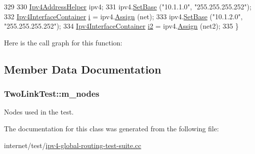 \begin{DoxyCode}
329 
330   \hyperlink{classns3_1_1Ipv4AddressHelper}{Ipv4AddressHelper} ipv4;
331   ipv4.\hyperlink{classns3_1_1Ipv4AddressHelper_acf7b16dd25bac67e00f5e25f90a9a035}{SetBase} (\textcolor{stringliteral}{"10.1.1.0"}, \textcolor{stringliteral}{"255.255.255.252"});
332   \hyperlink{classns3_1_1Ipv4InterfaceContainer}{Ipv4InterfaceContainer} \hyperlink{bernuolliDistribution_8m_a6f6ccfcf58b31cb6412107d9d5281426}{i} = ipv4.\hyperlink{classns3_1_1Ipv4AddressHelper_af8e7f4a1a7e74c00014a1eac445a27af}{Assign} (net);
333   ipv4.\hyperlink{classns3_1_1Ipv4AddressHelper_acf7b16dd25bac67e00f5e25f90a9a035}{SetBase} (\textcolor{stringliteral}{"10.1.2.0"}, \textcolor{stringliteral}{"255.255.255.252"});
334   \hyperlink{classns3_1_1Ipv4InterfaceContainer}{Ipv4InterfaceContainer} \hyperlink{generate__test__data__lte__sinr_8m_a2fce890a7c411f1fe7c0c55ec9eb4106}{i2} = ipv4.\hyperlink{classns3_1_1Ipv4AddressHelper_af8e7f4a1a7e74c00014a1eac445a27af}{Assign} (net2);
335 \}
\end{DoxyCode}


Here is the call graph for this function\+:




\subsection{Member Data Documentation}
\subsubsection[{\texorpdfstring{m\+\_\+nodes}{m_nodes}}]{ Two\+Link\+Test\+::m\+\_\+nodes\hspace{0.3cm}{\ttfamily [private]}}\hypertarget{classTwoLinkTest_a535eefa99c2bbfc3103efa335fd96d76}{}\label{classTwoLinkTest_a535eefa99c2bbfc3103efa335fd96d76}


Nodes used in the test. 



The documentation for this class was generated from the following file\+:\begin{DoxyCompactItemize}
\item 
internet/test/\hyperlink{ipv4-global-routing-test-suite_8cc}{ipv4-\/global-\/routing-\/test-\/suite.\+cc}\end{DoxyCompactItemize}
